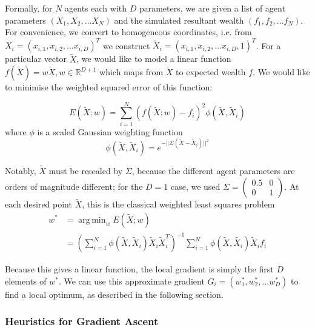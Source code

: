 \documentclass[11pt]{article}
\DeclareMathOperator*{\argmin}{arg\,min}
\begin{document}
Formally, for $N$ agents each with $D$ parameters, we are given a list of agent parameters $(X_1, X_2, \ldots X_N)$ and the simulated resultant wealth $(f_1, f_2, \ldots f_N)$. For convenience, we convert to homogeneous coordinates, i.e. from $X_i = (x_{i,1}, x_{i,2}, \ldots x_{i,D})^T$ we construct $\tilde{X}_i = (x_{i,1}, x_{i,2}, \ldots x_{i,D},  1)^T$. For a particular vector $\tilde{X}$, we would like to model a linear function $f(\tilde{X}) = w \tilde{X}, w \in \mathbb{R}^{D+1}$ which maps from $\tilde{X}$ to expected wealth $f$. We would like to minimise the weighted squared error of this function:

\begin{equation}
E(\tilde{X}; w) = \sum_{i=1}^N (f(\tilde{X}; w) - f_i)^2 \phi(\tilde{X}, \tilde{X}_i)
\end{equation}
where $\phi$ is a scaled Gaussian weighting function
\begin{equation}
\phi(\tilde{X}, \tilde{X}_i) = e^{-||\Sigma (\tilde{X}-\tilde{X}_i)||^2}
\end{equation}

Notably, $\tilde{X}$ must be rescaled by $\Sigma$, because the different agent parameters are orders of magnitude different; for the $D=1$ case, we used $\Sigma = \left( \begin{smallmatrix} 0.5&0\\0&1 \end{smallmatrix} \right) $. At each desired point $\tilde{X}$, this is the classical weighted least squares problem
\begin{align}
w^{*} &= \argmin_w E(\tilde{X}; w) \\
 &= \left( \sum_{i=1}^N \phi(\tilde{X},\tilde{X}_i) \tilde{X}_i \tilde{X}_i^T \right)^{-1} \sum_{i=1}^N \phi({\tilde{X}, \tilde{X_i}}) \tilde{X}_i f_i
\end{align}

Because this gives a linear function, the local gradient is simply the first $D$ elements of $w^*$. We can use this approximate gradient $G_i = (w^*_1, w^*_2, \ldots w^*_D)$ to find a local optimum, as described in the following section.

\subsubsection{ Heuristics for Gradient Ascent}
\end{document}
